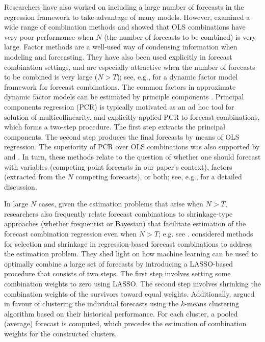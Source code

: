 \documentclass[a4paper,11pt]{article}
\begin{document}
Researchers have also worked on including a large number of forecasts in the regression framework to take advantage of many models. However, \citet{Chan1999-io} examined a wide range of combination methods and showed that OLS combinations have very poor performance when $N$ (the number of forecasts to be combined) is very large. Factor methods are a well-used way of condensing information when modeling and forecasting. They have also been used explicitly in forecast combination settings, and are especially attractive when the number of forecasts to be combined is very large ($N > T$); see, e.g., \citet{Chan1999-io} for a dynamic factor model framework for forecast combinations. The common factors in approximate dynamic factor models can be estimated by principle components \citep{Stock1999-fi}. Principal components regression (PCR) is typically motivated as an ad hoc tool for solution of multicollinearity. \citet{Chan1999-io} and \citet{Stock2004-rq} explicitly applied PCR to forecast combinations, which forms a two-step procedure. The first step extracts the principal components. The second step produces the final forecasts by means of OLS regression. The superiority of PCR over OLS combinations was also supported by \citet{Rapach2008-jh} and \citet{Poncela2011-vz}. In turn, these methods relate to the question of whether one should forecast with variables (competing point forecasts in our paper's context), factors (extracted from the $N$ competing forecasts), or both; see, e.g., \citet{Castle2013-fv} for a detailed discussion.

In large $N$ cases, given the estimation problems that arise when $N > T$, researchers also frequently relate forecast combinations to shrinkage-type approaches (whether frequentist or Bayesian) that facilitate estimation of the forecast combination regression even when $N > T$; e.g. see \citet{Stock2004-rq}. \citet{Diebold2019-ml} considered methods for selection and shrinkage in regression-based forecast combinations to address the estimation problem. They shed light on how machine learning can be used to optimally combine a large set of forecasts by introducing a LASSO-based procedure that consists of two steps. The first step involves setting some combination weights to zero using LASSO. The second step involves shrinking the combination weights of the survivors toward equal weights. Additionally, \citet{Aiolfi2006-rh} argued in favour of clustering the individual forecasts using the $k$-means clustering algorithm based on their historical performance. For each cluster, a pooled (average) forecast is computed, which precedes the estimation of combination weights for the constructed clusters.
\end{document}
